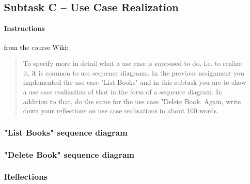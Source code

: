 \subsection{Subtask C -- Use Case Realization}\label{task-1c}
\paragraph{Instructions}\label{task-1c-instructions}
from the course Wiki\cite{1dv600:lab2:instructions}:

\begin{quote}
  To specify more in detail what a use case is supposed to do, i.e. to realize
  it, it is common to use sequence diagrams. In the previous assignment you
  implemented the use case "List Books" and in this subtask you are to show a
  use case realization of that in the form of a sequence diagram. In addition
  to that, do the same for the use case "Delete Book.  Again, write down your
  reflections on use case realisations in about 100 words.
\end{quote}


\subsubsection{"List Books" sequence diagram}\label{task-1c-sequence1}
%


\subsubsection{"Delete Book" sequence diagram}\label{task-1c-sequence2}
%


\subsubsection{Reflections}\label{task-1c-reflect}
%

